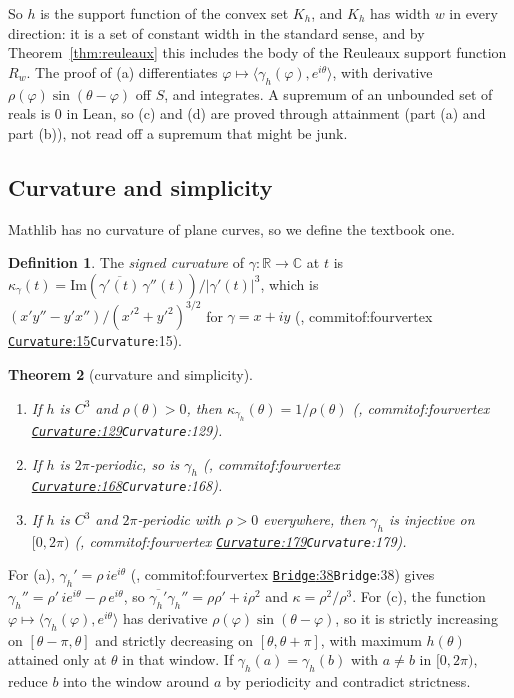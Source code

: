 \documentclass[11pt]{article}
\newtheorem{theorem}{Theorem}
\theoremstyle{definition}
\newtheorem{definition}[theorem]{Definition}
\theoremstyle{remark}
\newcommand{\RR}{\mathbb{R}}
\newcommand{\CC}{\mathbb{C}}
\newcommand{\commitof}[1]{\csname commitof:#1\endcsname}
\newcommand{\repo}[1]{https://github.com/jpbald93/#1}
\newcommand{\src}[4]{\ifcsname commitof:#1\endcsname
  \href{\repo{#1}/blob/\commitof{#1}/#2/#3.lean\#L#4}{\texttt{#3}:#4}\else\texttt{#3}:#4\fi}
\begin{document}
So $h$ is the support function of the convex set $K_h$, and $K_h$ has width $w$ in every direction:
it is a set of constant width in the standard sense, and by Theorem~\ref{thm:reuleaux} this includes
the body of the Reuleaux support function $R_w$. The proof of (a) differentiates
$\varphi\mapsto\langle\gamma_h(\varphi), e^{i\theta}\rangle$, with derivative
$\rho(\varphi)\sin(\theta-\varphi)$ off $S$, and integrates. A supremum of an unbounded set of reals
is $0$ in Lean, so (c) and (d) are proved through attainment (part (a) and part (b)), not read off a
supremum that might be junk.

\subsection{Curvature and simplicity}

Mathlib has no curvature of plane curves, so we define the textbook one.

\begin{definition}
The \emph{signed curvature} of $\gamma:\RR\to\CC$ at $t$ is
$\kappa_\gamma(t) = \mathrm{Im}(\overline{\gamma'(t)}\,\gamma''(t))/\lvert\gamma'(t)\rvert^3$, which is
$(x'y''-y'x'')/(x'^2+y'^2)^{3/2}$ for $\gamma = x+iy$ (, \src{fourvertex}{FourVertex}{Curvature}{15}).
\end{definition}

\begin{theorem}[curvature and simplicity]\label{thm:curv}
\begin{enumerate}
\item[(a)] If $h$ is $C^3$ and $\rho(\theta)>0$, then $\kappa_{\gamma_h}(\theta) = 1/\rho(\theta)$
(, \src{fourvertex}{FourVertex}{Curvature}{129}).
\item[(b)] If $h$ is $2\pi$-periodic, so is $\gamma_h$ (, \src{fourvertex}{FourVertex}{Curvature}{168}).
\item[(c)] If $h$ is $C^3$ and $2\pi$-periodic with $\rho>0$ everywhere, then $\gamma_h$ is injective on $[0,2\pi)$
(, \src{fourvertex}{FourVertex}{Curvature}{179}).
\end{enumerate}
\end{theorem}

For (a), $\gamma_h' = \rho\,ie^{i\theta}$ (, \src{fourvertex}{FourVertex}{Bridge}{38}) gives $\gamma_h'' = \rho'\,ie^{i\theta}-\rho\,e^{i\theta}$,
so $\overline{\gamma_h'}\gamma_h'' = \rho\rho'+i\rho^2$ and $\kappa = \rho^2/\rho^3$. For (c), the
function $\varphi\mapsto\langle\gamma_h(\varphi),e^{i\theta}\rangle$ has derivative
$\rho(\varphi)\sin(\theta-\varphi)$, so it is strictly increasing on $[\theta-\pi,\theta]$ and strictly
decreasing on $[\theta,\theta+\pi]$, with maximum $h(\theta)$ attained only at $\theta$ in that
window. If $\gamma_h(a) = \gamma_h(b)$ with $a\ne b$ in $[0,2\pi)$, reduce $b$ into the window around
$a$ by periodicity and contradict strictness.
\end{document}
